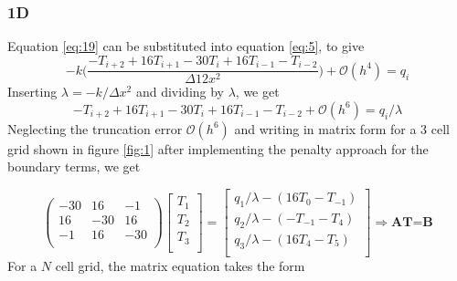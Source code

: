 \documentclass[12pt]{amsart}   %
\begin{document}
\subsubsection{1D} Equation \ref{eq:19} can be substituted into equation \ref{eq:5}, to give
\begin{equation}
-k \Bigg(\frac{-T_{i+2}+16T_{i+1} -30T_{i} + 16T_{i-1} - T_{i-2}}{\Delta 12x^2} \Bigg)+\mathcal{O}(h^4) = q_i
\end{equation}
Inserting $\lambda = -k/\Delta x^2$ and dividing by $\lambda$, we get
\begin{equation}
{-T_{i+2}+16T_{i+1} -30T_{i} + 16T_{i-1} - T_{i-2}} +\mathcal{O}(h^6) = q_i/\lambda
\end{equation}
Neglecting the truncation error $\mathcal{O}(h^6)$ and writing in matrix form for a 3 cell grid shown in figure \ref{fig:1} after implementing the penalty approach for the boundary terms, we get

\begin{equation}
 \begin{pmatrix}
-30 & 16 & -1 \\
16 & -30 & 16 \\
-1 & 16 & -30 \\
\end{pmatrix} \begin{bmatrix}
T_{1}\\
T_{2}\\
T_{3}\\
\end{bmatrix} =
\begin{bmatrix}
{q_{1}}/{\lambda}-(16T_{0}-T_{-1})\\
{q_{2}}/{\lambda}-(-T_{-1}-T_{4})\\
{q_{3}}/{\lambda}-(16T_{4}-T_{5})\\
\end{bmatrix} \Rightarrow \textbf{AT=B}
\end{equation}
For a $N$ cell grid, the matrix equation takes the form
\end{document}
